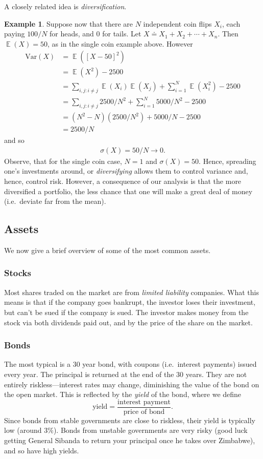 \documentclass[12pt]{article}
\DeclareMathOperator{\ex}{\mathbb{E}}
\newcommand{\var}{\mathrm{Var}}
\theoremstyle{plain}
\theoremstyle{definition}
\newtheorem*{example}{Example}
\theoremstyle{remark}
\numberwithin{equation}{section}  %
\begin{document}
A closely related idea is \emph{diversification}. 
\begin{example}
	Suppose now that there are $N$ independent coin flips $X_i$, each paying 
	$100/N$ for heads, and $0$ for tails. Let $X \doteq X_1 + X_2 + \cdots + 
	X_n$. Then $\ex(X) = 50$, as in the single coin example above. However
	\begin{align*}
		\var(X)
		& = \ex({[X - 50]}^2)
		\\
		& = \ex(X^2) - 2500
		\\
		& = \sum_{i,j: i \neq j} \ex(X_i)\ex(X_j) + \sum_{i=1}^N \ex(X_i^2) - 2500 
		\\
		& = \sum_{i,j: i \neq j} 2500/N^2 + \sum_{i=1}^{N} 5000/N^2 - 2500
		\\
		& = (N^{2} - N)(2500/N^2) + 5000/N - 2500
		\\
		& = 2500/N 
	\end{align*}
	and so
	\begin{align*}
		\sigma(X) = 50/N \to 0.
	\end{align*}
	Observe, that for the single coin case, $N = 1$ and $\sigma(X) = 50$.
	Hence, spreading one's investments around, or \emph{diversifying} allows 
	them to
	control variance and, hence, control risk. However, a consequence of our 
	analysis is that the more diversified a portfolio, the less chance that one 
	will make a great deal of money (i.e.\ deviate far from the mean).  
\end{example}
\subsection{Assets}
We now give a brief overview of some of the most common assets.

\subsubsection{Stocks}
Most shares traded on the market are from \emph{limited liability} companies.
What this means is that if the company goes bankrupt, the investor loses their 
investment, but can't be sued if the company is sued. The investor makes money 
from the stock via both dividends paid out, and by the price of the share on 
the market.

\subsubsection{Bonds} 
The most typical is a $30$ year bond, with coupons (i.e.\ interest payments) 
issued every year. The principal is returned at the end of the $30$ years.
They are  not entirely riskless---interest rates may change, diminishing the 
value of the bond on the open market. This is reflected by the \emph{yield} of 
the bond, where we define \begin{equation*}
	\text{yield} = \frac{\text{interest payment}}{\text{price of bond}}.
\end{equation*}
Since bonds from stable governments are close to riskless, their yield is 
typically low (around $3\%$). Bonds from unstable governments are very risky 
(good luck getting General Sibanda to return your principal once he takes over 
Zimbabwe), and so have high yields.
\end{document}
